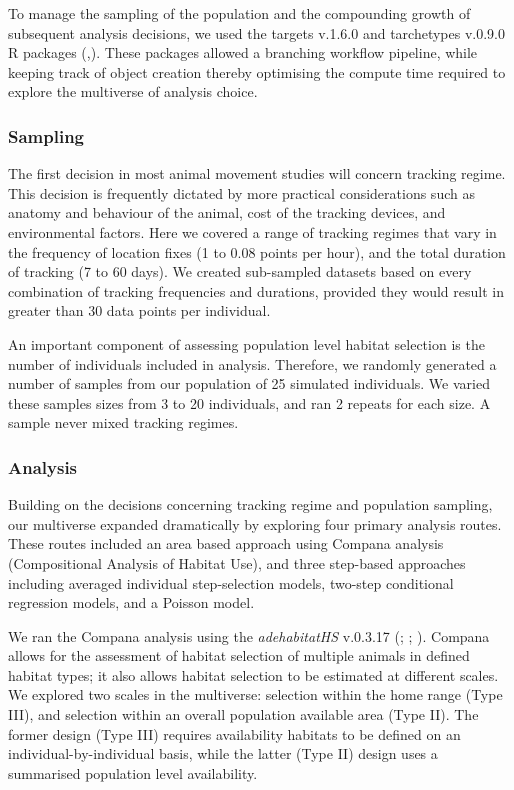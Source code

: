 \documentclass[10pt,a4paper]{article}
\begin{document}
To manage the sampling of the population and the compounding growth of subsequent analysis decisions, we used the targets v.1.6.0 and tarchetypes v.0.9.0 R packages (,).
These packages allowed a branching workflow pipeline, while keeping track of object creation thereby optimising the compute time required to explore the multiverse of analysis choice.

\subsubsection{Sampling}\label{sampling}

The first decision in most animal movement studies will concern tracking regime.
This decision is frequently dictated by more practical considerations such as anatomy and behaviour of the animal, cost of the tracking devices, and environmental factors.
Here we covered a range of tracking regimes that vary in the frequency of location fixes (1 to 0.08 points per hour), and the total duration of tracking (7 to 60 days).
We created sub-sampled datasets based on every combination of tracking frequencies and durations, provided they would result in greater than 30 data points per individual.

An important component of assessing population level habitat selection is the number of individuals included in analysis.
Therefore, we randomly generated a number of samples from our population of 25 simulated individuals.
We varied these samples sizes from 3 to 20 individuals, and ran 2 repeats for each size.
A sample never mixed tracking regimes.

\subsubsection{Analysis}\label{analysis}

Building on the decisions concerning tracking regime and population sampling, our multiverse expanded dramatically by exploring four primary analysis routes.
These routes included an area based approach using Compana analysis (Compositional Analysis of Habitat Use), and three step-based approaches including averaged individual step-selection models, two-step conditional regression models, and a Poisson model.

We ran the Compana analysis using the \emph{adehabitatHS} v.0.3.17 (; ; ).
Compana allows for the assessment of habitat selection of multiple animals in defined habitat types; it also allows habitat selection to be estimated at different scales.
We explored two scales in the multiverse: selection within the home range (Type III), and selection within an overall population available area (Type II).
The former design (Type III) requires availability habitats to be defined on an individual-by-individual basis, while the latter (Type II) design uses a summarised population level availability.
\end{document}
